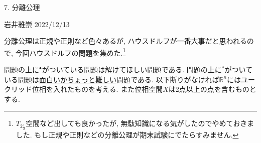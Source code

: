 \documentclass[dvipdfmx,a4paper,11pt]{article}
\newcommand{\R}{\mathbb{R}}
\theoremstyle{definition}
\begin{document}

\begin{center}
{\Large 7. 分離公理}
\end{center}

\begin{flushright}
 岩井雅崇 2022/12/13
\end{flushright}

分離公理は正規や正則など色々あるが, ハウスドルフが一番大事だと思われるので, 今回ハウスドルフの問題を集めた.\footnote{$T_{2 \frac{1}{2}}$空間など出しても良かったが, 無駄知識になる気がしたのでやめておきました. もし正規や正則などの分離公理が期末試験にでたらすみません.}

問題の上に$^{\bullet}$がついている問題は\underline{解けてほしい}問題である. 問題の上に$^{*}$がついている問題は\underline{面白いかちょっと難しい}問題である.  以下断りがなければ$\R^{n}$にはユークリッド位相を入れたものを考える. また位相空間$X$は2点以上の点を含むものとする.
\end{document}
